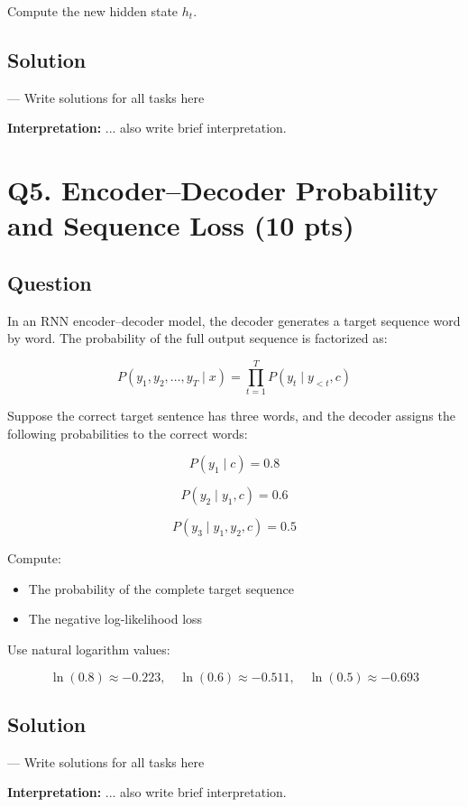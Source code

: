 \documentclass[11pt]{article}
\begin{document}
Compute the new hidden state \(h_t\).

\subsection*{Solution}

--- Write solutions for all tasks here 

\noindent \textbf{Interpretation:} ... also write brief interpretation.

\section*{Q5. Encoder--Decoder Probability and Sequence Loss (10 pts)}

\subsection*{Question}

In an RNN encoder--decoder model, the decoder generates a target sequence word by word. The probability of the full output sequence is factorized as:

\[
P(y_1, y_2, \dots, y_T \mid x) =
\prod_{t=1}^{T} P(y_t \mid y_{<t}, c)
\]

Suppose the correct target sentence has three words, and the decoder assigns the following probabilities to the correct words:

\[
P(y_1 \mid c) = 0.8
\]

\[
P(y_2 \mid y_1,c) = 0.6
\]

\[
P(y_3 \mid y_1,y_2,c) = 0.5
\]

Compute:
\begin{itemize}
    \item The probability of the complete target sequence
    \item The negative log-likelihood loss
\end{itemize}

Use natural logarithm values:

\[
\ln(0.8) \approx -0.223,\quad
\ln(0.6) \approx -0.511,\quad
\ln(0.5) \approx -0.693
\]

\subsection*{Solution}

--- Write solutions for all tasks here 

\noindent \textbf{Interpretation:} ... also write brief interpretation.
\end{document}
